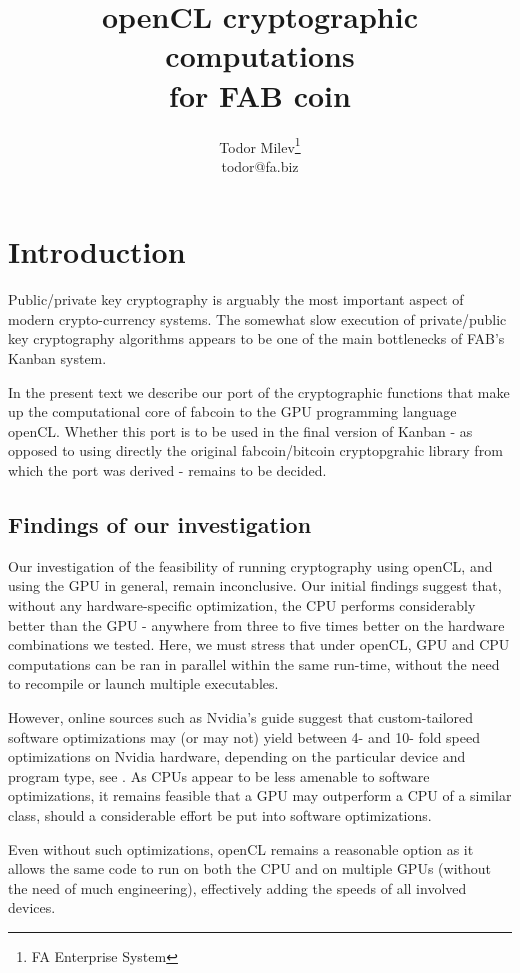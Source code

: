\documentclass{article}
\title{
openCL cryptographic computations \\
for FAB coin
}
\author{Todor Milev\footnote{FA Enterprise System}\\ todor@fa.biz}
\begin{document}
\maketitle
\section{Introduction}
Public/private key cryptography is arguably the most important aspect of modern crypto-currency systems. The somewhat slow execution of private/public key cryptography algorithms appears to be one of the main bottlenecks of FAB's Kanban system. 

In the present text we describe our port of the cryptographic functions that make up the computational core of fabcoin to the GPU programming language openCL. Whether this port is to be used in the final version of Kanban - as opposed to using directly the original fabcoin/bitcoin cryptopgrahic library from which the port was derived - remains to be decided.


\subsection{Findings of our investigation}
Our investigation of the feasibility of running cryptography using openCL, and using the GPU in general, remain inconclusive. Our initial findings suggest that, without any hardware-specific optimization, the CPU performs considerably better than the GPU - anywhere from three to five times better on the hardware combinations we tested.  Here, we must stress that under openCL, GPU and CPU computations can be ran in parallel within the same run-time, without the need to recompile or launch multiple executables. 

However, online sources such as Nvidia's guide \cite{NVIDIA:openCLBestPractices} suggest that custom-tailored software optimizations may (or may not) yield between 4- and 10- fold speed optimizations on Nvidia hardware, depending on the particular device and program type, see \cite[page 22]{NVIDIA:openCLBestPractices}. As CPUs appear to be less amenable to software optimizations, it remains feasible that a GPU may outperform a CPU of a similar class, should a considerable effort be put into software optimizations. 

Even without such optimizations, openCL remains a reasonable option as it allows the same code to run on both the CPU and on multiple GPUs (without the need of much engineering), effectively adding the speeds of all involved devices. 
\end{document}
